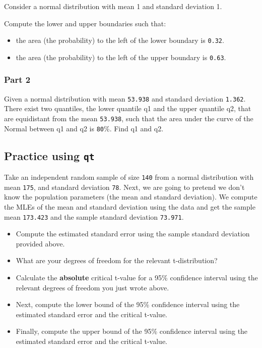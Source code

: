 \documentclass[12pt,]{krantz}
\providecommand{\tightlist}{%
  \setlength{\itemsep}{0pt}\setlength{\parskip}{0pt}}
\theoremstyle{definition}
\theoremstyle{definition}
\theoremstyle{definition}
\theoremstyle{remark}
\begin{document}
Consider a normal distribution with mean 1 and standard deviation 1.

Compute the lower and upper boundaries such that:

\begin{itemize}
\tightlist
\item
  the area (the probability) to the left of the lower boundary is
  \texttt{0.32}.
\item
  the area (the probability) to the left of the upper boundary is
  \texttt{0.63}.
\end{itemize}

\subsubsection{Part 2}\label{part-2-1}

Given a normal distribution with mean \texttt{53.938} and standard
deviation \texttt{1.362}. There exist two quantiles, the lower quantile
q1 and the upper quantile q2, that are equidistant from the mean
\texttt{53.938}, such that the area under the curve of the Normal
between q1 and q2 is \texttt{80}\%. Find q1 and q2.

\subsection{\texorpdfstring{Practice using
\texttt{qt}}{Practice using qt}}\label{practice-using-qt}

Take an independent random sample of size \texttt{140} from a normal
distribution with mean \texttt{175}, and standard deviation \texttt{78}.
Next, we are going to pretend we don't know the population parameters
(the mean and standard deviation). We compute the MLEs of the mean and
standard deviation using the data and get the sample mean
\texttt{173.423} and the sample standard deviation \texttt{73.971}.

\begin{itemize}
\tightlist
\item
  Compute the estimated standard error using the sample standard
  deviation provided above.
\item
  What are your degrees of freedom for the relevant t-distribution?
\item
  Calculate the \textbf{absolute} critical t-value for a 95\% confidence
  interval using the relevant degrees of freedom you just wrote above.
\item
  Next, compute the lower bound of the 95\% confidence interval using
  the estimated standard error and the critical t-value.
\item
  Finally, compute the upper bound of the 95\% confidence interval using
  the estimated standard error and the critical t-value.
\end{itemize}
\end{document}
